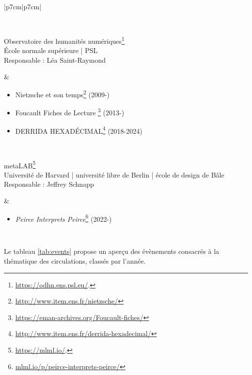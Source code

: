 \begin{table}[htbp]
{\begin{tabular}[t]{|p{7cm}|p{7cm}|}
\begin{minipage}[t]{\linewidth}
\begin{itemize}[leftmargin=*]
				\end{itemize}
			\end{minipage} \\ \hline
			\begin{minipage}[t]{\linewidth}
				Observatoire des humanités numériques\footnote{\url{https://odhn.ens.psl.eu/}.}\\
				École normale supérieure | \textsc{PSL}\\
				Responsable : Léa  Saint-Raymond
			\end{minipage} 
			& 
			\begin{minipage}[t]{\linewidth}
				\begin{itemize}[leftmargin=*]
					\item \og{}Nietzsche et son temps\fg{}\footnote{\url{http://www.item.ens.fr/nietzsche/}} (2009-)
					\item \og{}Foucault Fiches de Lecture \fg{}\footnote{\url{https://eman-archives.org/Foucault-fiches/}} (2013-)
					\item \og{}DERRIDA HEXADÉCIMAL\fg{}\footnote{\url{http://www.item.ens.fr/derrida-hexadecimal/}} (2018-2024)
				\end{itemize}
			\end{minipage} \\ \hline
						\begin{minipage}[t]{\linewidth}
				meta\textsc{LAB}\footnote{\url{https://mlml.io/}.}\\
				Université de Harvard | université libre de Berlin | école de design de Bâle\\
				Responsable : Jeffrey Schnapp
			\end{minipage} 
			& 
			\begin{minipage}[t]{\linewidth}
				\begin{itemize}[leftmargin=*]
					\item \textit{Peirce Interprets Peirce}\footnote{\url{mlml.io/p/peirce-interprets-peirce/}} (2022-)
				\end{itemize}
			\end{minipage} \\ \hline
		\end{tabular}%
	}
	\caption{Structures de recherche axées sur la thématique des circulations des savoirs.}
	\label{tab:equipes}
\end{table}



Le tableau \ref{tab:events} propose un aperçu des évènements consacrés à la thématique des circulations, classés par l'année. 

